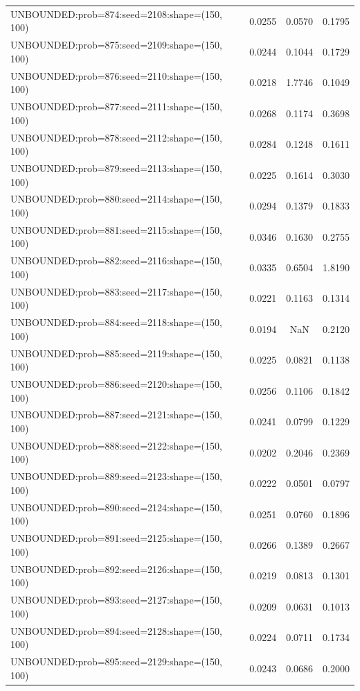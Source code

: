 \begin{longtable}{lccc}
UNBOUNDED:prob=874:seed=2108:shape=(150, 100) &   0.0255 &  0.0570 &  0.1795 \\
UNBOUNDED:prob=875:seed=2109:shape=(150, 100) &   0.0244 &  0.1044 &  0.1729 \\
UNBOUNDED:prob=876:seed=2110:shape=(150, 100) &   0.0218 &  1.7746 &  0.1049 \\
UNBOUNDED:prob=877:seed=2111:shape=(150, 100) &   0.0268 &  0.1174 &  0.3698 \\
UNBOUNDED:prob=878:seed=2112:shape=(150, 100) &   0.0284 &  0.1248 &  0.1611 \\
UNBOUNDED:prob=879:seed=2113:shape=(150, 100) &   0.0225 &  0.1614 &  0.3030 \\
UNBOUNDED:prob=880:seed=2114:shape=(150, 100) &   0.0294 &  0.1379 &  0.1833 \\
UNBOUNDED:prob=881:seed=2115:shape=(150, 100) &   0.0346 &  0.1630 &  0.2755 \\
UNBOUNDED:prob=882:seed=2116:shape=(150, 100) &   0.0335 &  0.6504 &  1.8190 \\
UNBOUNDED:prob=883:seed=2117:shape=(150, 100) &   0.0221 &  0.1163 &  0.1314 \\
UNBOUNDED:prob=884:seed=2118:shape=(150, 100) &   0.0194 &     NaN &  0.2120 \\
UNBOUNDED:prob=885:seed=2119:shape=(150, 100) &   0.0225 &  0.0821 &  0.1138 \\
UNBOUNDED:prob=886:seed=2120:shape=(150, 100) &   0.0256 &  0.1106 &  0.1842 \\
UNBOUNDED:prob=887:seed=2121:shape=(150, 100) &   0.0241 &  0.0799 &  0.1229 \\
UNBOUNDED:prob=888:seed=2122:shape=(150, 100) &   0.0202 &  0.2046 &  0.2369 \\
UNBOUNDED:prob=889:seed=2123:shape=(150, 100) &   0.0222 &  0.0501 &  0.0797 \\
UNBOUNDED:prob=890:seed=2124:shape=(150, 100) &   0.0251 &  0.0760 &  0.1896 \\
UNBOUNDED:prob=891:seed=2125:shape=(150, 100) &   0.0266 &  0.1389 &  0.2667 \\
UNBOUNDED:prob=892:seed=2126:shape=(150, 100) &   0.0219 &  0.0813 &  0.1301 \\
UNBOUNDED:prob=893:seed=2127:shape=(150, 100) &   0.0209 &  0.0631 &  0.1013 \\
UNBOUNDED:prob=894:seed=2128:shape=(150, 100) &   0.0224 &  0.0711 &  0.1734 \\
UNBOUNDED:prob=895:seed=2129:shape=(150, 100) &   0.0243 &  0.0686 &  0.2000 \\

\end{longtable}
